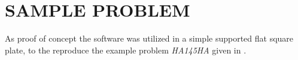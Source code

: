 \section{SAMPLE PROBLEM}

As proof of concept the software was utilized in a simple supported flat square plate, to the reproduce the example problem \emph{HA145HA} given in \citet{siemens_nx_2014}.

